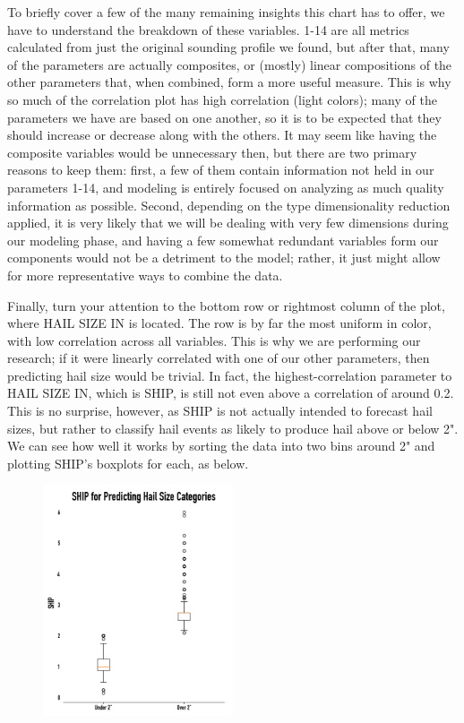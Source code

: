 \documentclass[fleqn,10pt]{SelfArx} %
\begin{document}
To briefly cover a few of the many remaining insights this chart has to offer, we have to understand the breakdown of these variables. 1-14 are all metrics calculated from just the original sounding profile we found, but after that, many of the parameters are actually composites, or (mostly) linear compositions of the other parameters that, when combined, form a more useful measure. This is why so much of the correlation plot has high correlation (light colors); many of the parameters we have are based on one another, so it is to be expected that they should increase or decrease along with the others. It may seem like having the composite variables would be unnecessary then, but there are two primary reasons to keep them: first, a few of them contain information not held in our parameters 1-14, and modeling is entirely focused on analyzing as much quality information as possible. Second, depending on the type dimensionality reduction applied, it is very likely that we will be dealing with very few dimensions during our modeling phase, and having a few somewhat redundant variables form our components would not be a detriment to the model; rather, it just might allow for more representative ways to combine the data.

Finally, turn your attention to the bottom row or rightmost column of the plot, where HAIL SIZE IN is located. The row is by far the most uniform in color, with low correlation across all variables. This is why we are performing our research; if it were linearly correlated with one of our other parameters, then predicting hail size would be trivial. In fact, the highest-correlation parameter to HAIL SIZE IN, which is SHIP, is still not even above a correlation of around 0.2. This is no surprise, however, as SHIP is not actually intended to forecast hail sizes, but rather to classify hail events as likely to produce hail above or below 2". We can see how well it works by sorting the data into two bins around 2" and plotting SHIP's boxplots for each, as below.

\begin{figure}[H]
\includegraphics[width=0.5\textwidth, center=8.5cm]{"plots/ship_boxplots.png"} 
\end{figure}
\end{document}
